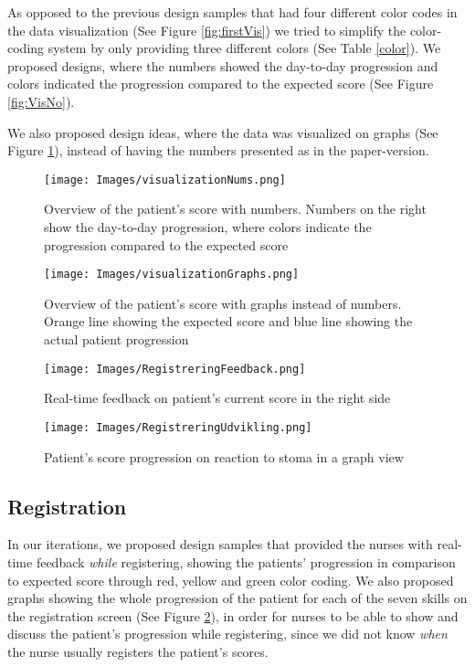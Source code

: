 As opposed to the previous design samples that had four different color codes in the data visualization (See Figure \ref{fig:firstVis}) we tried to simplify the color-coding system by only providing three different colors (See Table \ref{color}). We proposed designs, where the numbers showed the day-to-day progression and colors indicated the progression compared to the expected score (See Figure \ref{fig:VisNo}). 

We also proposed design ideas, where the data was visualized on graphs (See Figure \ref{fig:VisGraphs}), instead of having the numbers presented as in the paper-version. 

\begin{figure}
\centering
\begin{minipage}{0.46\textwidth}
\centering
\texttt{[image: Images/visualizationNums.png]}
			\caption{Overview of the patient's score with numbers. Numbers on the right show the day-to-day progression, where colors indicate the progression compared to the expected score} \label{fig:VisNo}
\end{minipage}\hfill
\begin{minipage}{0.46\textwidth}
\centering
\texttt{[image: Images/visualizationGraphs.png]}
			\caption{Overview of the patient's score with graphs instead of numbers. Orange line showing the expected score and blue line showing the actual patient progression} \label{fig:VisGraphs}
\end{minipage}
\end{figure}

\begin{figure}
\centering
\begin{minipage}{0.5\textwidth}
\centering
\texttt{[image: Images/RegistreringFeedback.png]}
			\caption{Real-time feedback on patient's \newline current score in the right side} \label{fig:RegistreringFeedback}
\end{minipage}\hfill
\begin{minipage}{0.5\textwidth}
\centering
\texttt{[image: Images/RegistreringUdvikling.png]}
			\caption{Patient's score progression on reaction to stoma in a graph view} \label{fig:RegistreringUdvikling}
\end{minipage}
\end{figure}


\subsection*{Registration}
In our iterations, we proposed design samples that provided the nurses with real-time feedback \textit{while} registering, showing the patients' progression in comparison to expected score through red, yellow and green color coding. We also proposed graphs showing the whole progression of the patient for each of the seven skills on the registration screen (See Figure \ref{fig:RegistreringUdvikling}), in order for nurses to be able to show and discuss the patient's progression while registering, since we did not know \textit{when} the nurse usually registers the patient's scores. 

